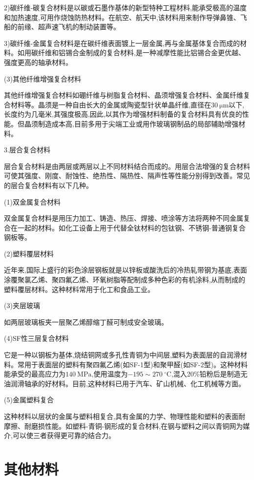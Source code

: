 \documentclass[UTF8]{ctexbook}
\newcommand{\◎}{\ensuremath{\bigcirc}}
\begin{document}
2)碳纤维-碳复合材料是以碳或石墨作基体的新型特种工程材料,能承受极高的温度和加热速度,可用作烧蚀防热材料。在航空、航天中,该材料用来制作导弹鼻锥、飞船的前缘、超声速飞机的制动装置等。

3)碳纤维-金属复合材料是在碳纤维表面镀上一层金属,再与金属基体复合而成的材料。如用碳纤维和铝锡合金制成的复合材料,是一种减摩性能比铝锡合金更优越、强度更高的轴承材料。

(3)其他纤维增强复合材料

其他纤维增强复合材料如硼纤维与树脂复合材料、晶须增强复合材料、金属纤维复合材料等。晶须是一种自由长大的金属或陶瓷型针状单晶纤维,直径在$30~\mathrm{\mu m}$以下,长度约为几毫米,其强度极高,因此,以其作为增强材料制备的复合材料具有优良的性能。但晶须制造成本高,目前多用于尖端工业或用作玻璃钢制品的局部辅助增强材料。

3.层合复合材料

层合复合材料是由两层或两层以上不同材料结合而成的。用层合法增强的复合材料可使其强度、刚度、耐蚀性、绝热性、隔热性、隔声性等性能分别得到改善。常见的层合复合材料有以下几种。

(1)双金属复合材料

双金属复合材料是用压力加工、铸造、热压、焊接、喷涂等方法将两种不同金属复合在一起的材料。如化工设备上用于代替全钛材料的包钛钢、不锈钢-普通钢复合钢板等。

(2)塑料覆层材料

近年来,国际上盛行的彩色涂层钢板就是以锌板或酸洗后的冷热轧带钢为基底,表面涂覆聚氯乙烯、聚四氟乙烯、环氧树脂等配制成多种色彩的有机涂料,从而制成的塑料覆层材料。这种材料常用于化工和食品工业。

(3)夹层玻璃

如两层玻璃板夹一层聚乙烯醇缩丁醛可制成安全玻璃。

(4)SF性三层复合材料

它是一种以钢板为基体,烧结铜网或多孔性青铜为中间层,塑料为表面层的自润滑材料。常用于表面层的塑料有聚四氟乙烯(如SF-1型)和聚甲醛(如SF-2型)。这种材料能承受的最高应力为$140~\mathrm{MPa}$,使用温度为$-195\sim270~^\circ\mathrm{C}$,混入20\%铅粉后是制造无油润滑轴承的好材料。目前,这种材料已用于汽车、矿山机械、化工机械等方面。

(5)金属塑料复合

这种材料以层状的金属与塑料相复合,具有金属的力学、物理性能和塑料的表面耐摩擦、耐磨损性能。如塑料-青铜-钢形成的复合材料,在钢与塑料之间以青铜网为媒介,可以使三者获得更可靠的结合力。

\section{其他材料}
\end{document}
